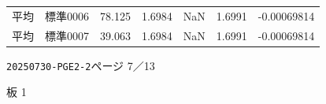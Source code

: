 \documentclass[UTF8,10pt,a4paper,fontset=fandol]{ctexart}
\newcommand{\fieldvalue}[1]{#1}
\begin{document}
\begin{center}
\begin{center}
\begin{tabularx}{\textwidth}{l l l l l l l}
平均 &
\fieldvalue{標準0006} &
\fieldvalue{78.125} &
\fieldvalue{1.6984} &
\fieldvalue{NaN} &
\fieldvalue{1.6991} &
\fieldvalue{-0.00069814} \\

平均 &
\fieldvalue{標準0007} &
\fieldvalue{39.063} &
\fieldvalue{1.6984} &
\fieldvalue{NaN} &
\fieldvalue{1.6991} &
\fieldvalue{-0.00069814}
\end{tabularx}
\normalsize

\newpage

\noindent\texttt{20250730-PGE2-2}\hfill ページ 7／13

\medskip
\noindent 板 1


\end{center}
\end{center}
\end{document}
